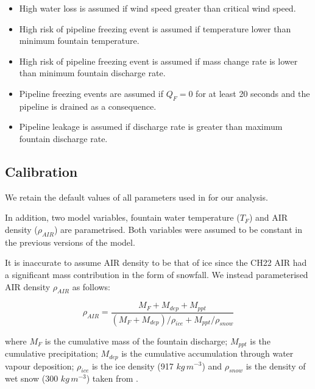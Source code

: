 \documentclass[tc, manuscript]{copernicus}
\begin{document}
\begin{itemize}

\item High water loss is assumed if wind speed greater than critical wind speed.

\item High risk of pipeline freezing event is assumed if temperature lower than minimum fountain temperature.

\item High risk of pipeline freezing event is assumed if mass change rate is lower than minimum fountain discharge rate. 

\item Pipeline freezing events are assumed if $Q_F = 0$ for at least 20 seconds and the pipeline is drained as a
  consequence.

\item Pipeline leakage is assumed if discharge rate is greater than maximum fountain discharge rate.

\end{itemize}

\subsection{Calibration}

We retain the default values of all parameters used in
\cite{balasubramanianInfluenceMeteorologicalConditions2022} for our analysis.  

In addition, two model variables, fountain water temperature ($T_F$) and AIR density ($\rho_{AIR}$) are
parametrised. Both variables were assumed to be constant in the previous versions of the model. 

It is inaccurate to assume AIR density to be that of ice since the CH22 AIR had a significant mass contribution
in the form of snowfall. We instead parameterised AIR density $\rho_{AIR}$ as follows:

\begin{equation}
  \rho_{AIR} = \frac{M_{F} + M_{dep} + M_{ppt}}{(M_{F} + M_{dep})/\rho_{ice} + M_{ppt}/\rho_{snow}}
\end{equation}

where $M_F$ is the cumulative mass of the fountain discharge; $M_{ppt}$ is the cumulative precipitation; $M_{dep}$ is the cumulative accumulation through water vapour deposition; $\rho_{ice}$ is the ice density (917 $kg\,m^{-3}$) and $\rho_{snow}$ is the density of wet snow (300 $kg\,m^{-3}$) taken from
\cite{cuffeyPhysicsGlaciers2010} .
\end{document}
